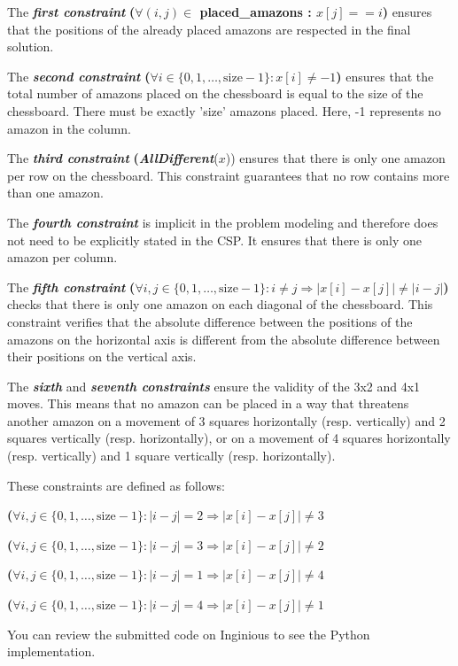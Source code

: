 \documentclass[11pt,a4paper]{report}
\begin{document}
\begin{answers}[10cm]

\small{The \textbf{\textit{first constraint}} \textbf{($\forall (i, j) \in$ placed\_amazons : $x[j] == i$)} ensures that the positions of the already placed amazons are respected in the final solution.\par
The \textbf{\textit{second constraint}} \textbf{($\forall i \in \{0, 1, \dots, \text{{size}}-1\} : x[i] \neq -1$)} ensures that the total number of amazons placed on the chessboard is equal to the size of the chessboard. There must be exactly 'size' amazons placed. Here, -1 represents no amazon in the column.\par

The \textbf{\textit{third constraint}} \textbf{(\textit{AllDifferent}}($x$)) ensures that there is only one amazon per row on the chessboard. This constraint guarantees that no row contains more than one amazon.\par

The \textbf{\textit{fourth constraint}} is implicit in the problem modeling and therefore does not need to be explicitly stated in the CSP. It ensures that there is only one amazon per column.\par

The \textbf{\textit{fifth constraint}} \textbf{($\forall i, j \in \{0, 1, \dots, \text{{size}}-1\} : i \neq j \Rightarrow |x[i] - x[j]| \neq |i - j|$)} checks that there is only one amazon on each diagonal of the chessboard. This constraint verifies that the absolute difference between the positions of the amazons on the horizontal axis is different from the absolute difference between their positions on the vertical axis.\par

The \textbf{\textit{sixth}} and \textbf{\textit{seventh constraints}} ensure the validity of the 3x2 and 4x1 moves. This means that no amazon can be placed in a way that threatens another amazon on a movement of 3 squares horizontally (resp. vertically) and 2 squares vertically (resp. horizontally), or on a movement of 4 squares horizontally (resp. vertically) and 1 square vertically (resp. horizontally).

These constraints are defined as follows:

\textbf{($\forall i, j \in \{0, 1, \dots, \text{{size}}-1\} : |i - j| = 2 \Rightarrow |x[i] - x[j]| \neq 3$}

\textbf{($\forall i, j \in \{0, 1, \dots, \text{{size}}-1\} : |i - j| = 3 \Rightarrow |x[i] - x[j]| \neq 2$}

\textbf{($\forall i, j \in \{0, 1, \dots, \text{{size}}-1\} : |i - j| = 1 \Rightarrow |x[i] - x[j]| \neq 4$}

\textbf{($\forall i, j \in \{0, 1, \dots, \text{{size}}-1\} : |i - j| = 4 \Rightarrow |x[i] - x[j]| \neq 1$}

You can review the submitted code on Inginious to see the Python implementation.
}

\end{answers}
\end{document}

